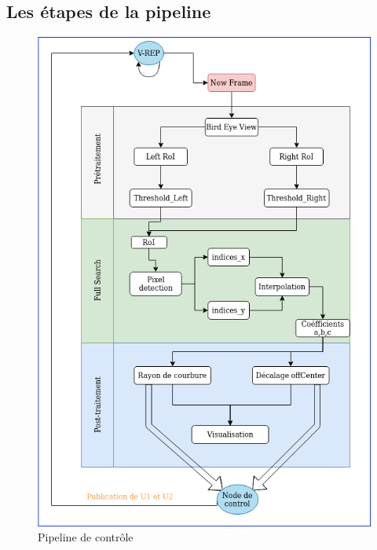 \documentclass[12pt, openany]{report}
\begin{document}
\subsection{Les étapes de la pipeline}
\begin{figure}[H]
     \centering
     \includegraphics[scale = 0.67]{pipeline.png}
     \caption{Pipeline de contrôle}
     \label{fig:pipeline}
\end{figure}
\pagebreak
\end{document}
